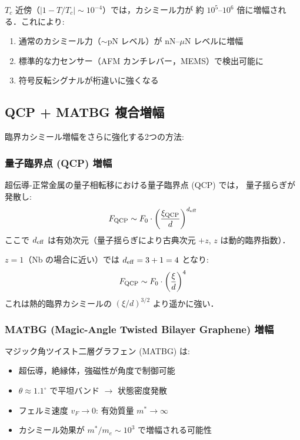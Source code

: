 \documentclass[11pt,a4paper]{article}
\begin{document}
\begin{keyresult}[臨界増幅の帰結]
$T_c$ 近傍（$|1-T/T_c| \sim 10^{-4}$）では，カシミール力が
約 $10^5$--$10^6$ 倍に増幅される．これにより:
\begin{enumerate}
\item 通常のカシミール力（$\sim$pN レベル）が nN--$\mu$N レベルに増幅
\item 標準的な力センサー（AFM カンチレバー，MEMS）で検出可能に
\item 符号反転シグナルが桁違いに強くなる
\end{enumerate}
\end{keyresult}

\subsection{QCP + MATBG 複合増幅}

臨界カシミール増幅をさらに強化する2つの方法:

\subsubsection{量子臨界点 (QCP) 増幅}

超伝導-正常金属の量子相転移における量子臨界点 (QCP) では，
量子揺らぎが発散し:
\begin{equation}
F_{\rm QCP} \sim F_0 \cdot \left(\frac{\xi_{\rm QCP}}{d}\right)^{d_{\rm eff}}
\end{equation}
ここで $d_{\rm eff}$ は有効次元（量子揺らぎにより古典次元 $+z$,
$z$ は動的臨界指数）．

$z = 1$（Nb の場合に近い）では $d_{\rm eff} = 3 + 1 = 4$ となり:
\begin{equation}
F_{\rm QCP} \sim F_0 \cdot \left(\frac{\xi}{d}\right)^{4}
\end{equation}
これは熱的臨界カシミールの $(\xi/d)^{3/2}$ より遥かに強い．

\subsubsection{MATBG (Magic-Angle Twisted Bilayer Graphene) 増幅}

マジック角ツイスト二層グラフェン (MATBG) は:
\begin{itemize}
\item 超伝導，絶縁体，強磁性が角度で制御可能
\item $\theta \approx 1.1^\circ$ で平坦バンド $\to$ 状態密度発散
\item フェルミ速度 $v_F \to 0$: 有効質量 $m^* \to \infty$
\item カシミール効果が $m^*/m_e \sim 10^3$ で増幅される可能性
\end{itemize}
\end{document}
